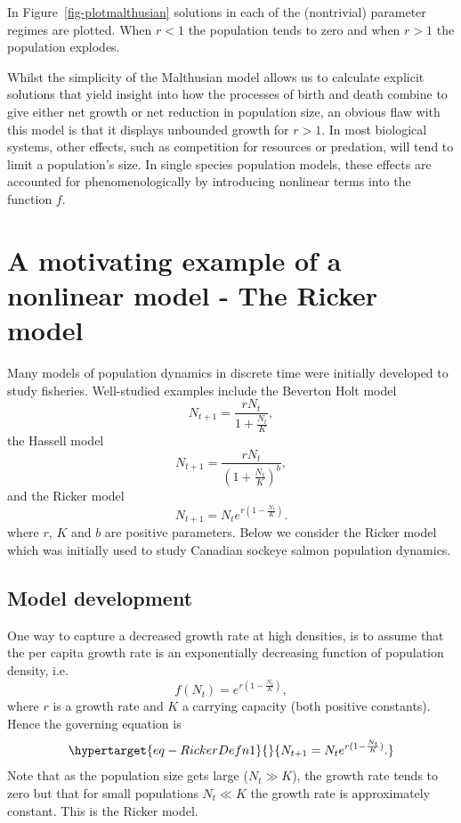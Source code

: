 \documentclass[
  letterpaper,
  DIV=11,
  numbers=noendperiod]{scrreprt}
\begin{document}
In Figure~\ref{fig-plotmalthusian} solutions in each of the (nontrivial)
parameter regimes are plotted. When \(r<1\) the population tends to zero
and when \(r>1\) the population explodes.

Whilst the simplicity of the Malthusian model allows us to calculate
explicit solutions that yield insight into how the processes of birth
and death combine to give either net growth or net reduction in
population size, an obvious flaw with this model is that it displays
unbounded growth for \(r>1\). In most biological systems, other effects,
such as competition for resources or predation, will tend to limit a
population's size. In single species population models, these effects
are accounted for phenomenologically by introducing nonlinear terms into
the function \(f\).

\hypertarget{a-motivating-example-of-a-nonlinear-model---the-ricker-model}{%
\section{A motivating example of a nonlinear model - The Ricker
model}\label{a-motivating-example-of-a-nonlinear-model---the-ricker-model}}

Many models of population dynamics in discrete time were initially
developed to study fisheries. Well-studied examples include the Beverton
Holt model \[
N_{t+1}=\frac{rN_t}{1+\frac{N_t}{K}},
\] the Hassell model \[
N_{t+1}=\frac{rN_t}{(1+\frac{N_t}{K})^b},
\] and the Ricker model \[
N_{t+1}=N_te^{r(1-\frac{N_t}{K})}.
\] where \(r\), \(K\) and \(b\) are positive parameters. Below we
consider the Ricker model which was initially used to study Canadian
sockeye salmon population dynamics.

\hypertarget{model-development}{%
\subsection{Model development}\label{model-development}}

One way to capture a decreased growth rate at high densities, is to
assume that the per capita growth rate is an exponentially decreasing
function of population density, i.e.~ \[
f(N_t)=e^{r(1-\frac{N_t}{K})},
\] where \(r\) is a growth rate and \(K\) a carrying capacity (both
positive constants). Hence the governing equation is
\begin{equation}\protect\hypertarget{eq-RickerDefn1}{}{
N_{t+1}=N_te^{r(1-\frac{N_t}{K})}.
}\label{eq-RickerDefn1}\end{equation} Note that as the population size
gets large (\(N_t\gg K\)), the growth rate tends to zero but that for
small populations \(N_t\ll K\) the growth rate is approximately
constant. This is the Ricker model.
\end{document}
